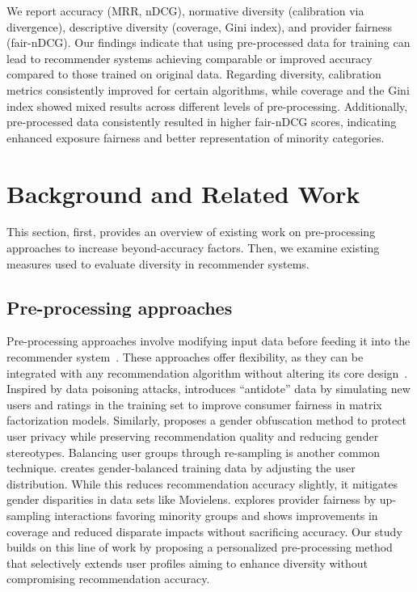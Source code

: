 \documentclass[runningheads]{llncs}
\begin{document}
We report accuracy (MRR, nDCG), normative diversity (calibration via divergence), descriptive diversity (coverage, Gini index), and provider fairness (fair-nDCG).
Our findings indicate that using pre-processed data for training can lead to recommender systems achieving comparable or improved accuracy compared to those trained on original data. 
Regarding diversity, calibration metrics consistently improved for certain algorithms, while coverage and the Gini index showed mixed results across different levels of pre-processing. 
Additionally, pre-processed data consistently resulted in higher fair-nDCG scores, indicating enhanced exposure fairness and better representation of minority categories. 


\section{Background and Related Work}

This section, first, provides an overview of existing work on pre-processing approaches to increase beyond-accuracy factors. 
Then, we examine existing measures used to evaluate diversity in recommender systems.

\subsection{Pre-processing approaches}
Pre-processing approaches involve modifying input data before feeding it into the recommender system~\cite{zhao2023fairness}. 
These approaches offer flexibility, as they can be integrated with any recommendation algorithm without altering its core design~\cite{meng2023survey,Boratto2024FairGNN}. 
Inspired by data poisoning attacks, \cite{Rastegarpanah2019Fighting} introduces ``antidote'' data by simulating new users and ratings in the training set to improve consumer fairness in matrix factorization models. 
Similarly, \cite{slokom2021PerBlur,weinsberg2012blurme} proposes a gender obfuscation method to protect user privacy while preserving recommendation quality and reducing gender stereotypes.
Balancing user groups through re-sampling is another common technique. 
\cite{pmlr-v81-ekstrand18a} creates gender-balanced training data by adjusting the user distribution. 
While this reduces recommendation accuracy slightly, it mitigates gender disparities in data sets like Movielens. 
\cite{boratto2021interplay} explores provider fairness by up-sampling interactions favoring minority groups and shows improvements in coverage and reduced disparate impacts without sacrificing accuracy. 
Our study builds on this line of work by proposing a personalized pre-processing method that selectively extends user profiles 
aiming to enhance diversity without compromising recommendation accuracy.
\end{document}
